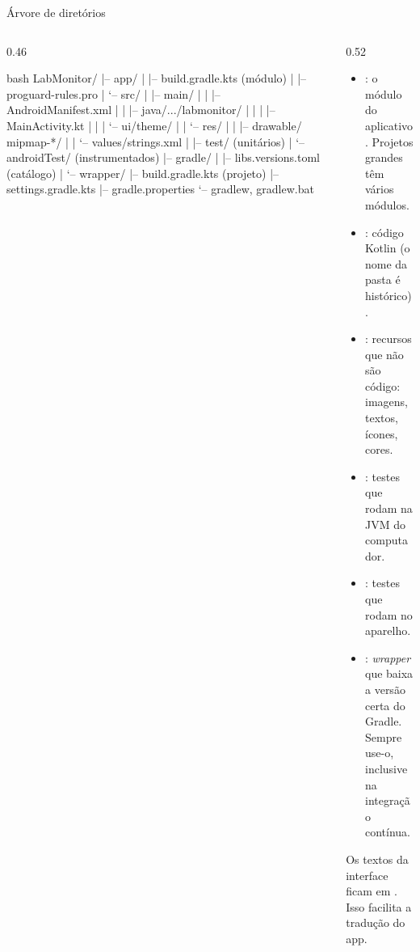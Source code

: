 \documentclass[aspectratio=169,10pt]{beamer}
\begin{document}
\begin{frame}[fragile]{Árvore de diretórios}
  \begin{columns}[T]
    \begin{column}{0.46\textwidth}
\begin{codigo}[title=LabMonitor/,listing options={style=dm,language=bash,basicstyle=\ttfamily\tiny}]{bash}
LabMonitor/
|-- app/
|   |-- build.gradle.kts      (módulo)
|   |-- proguard-rules.pro
|   `-- src/
|       |-- main/
|       |   |-- AndroidManifest.xml
|       |   |-- java/.../labmonitor/
|       |   |   |-- MainActivity.kt
|       |   |   `-- ui/theme/
|       |   `-- res/
|       |       |-- drawable/  mipmap-*/
|       |       `-- values/strings.xml
|       |-- test/            (unitários)
|       `-- androidTest/     (instrumentados)
|-- gradle/
|   |-- libs.versions.toml   (catálogo)
|   `-- wrapper/
|-- build.gradle.kts          (projeto)
|-- settings.gradle.kts
|-- gradle.properties
`-- gradlew, gradlew.bat
\end{codigo}
    \end{column}
    \begin{column}{0.52\textwidth}
      \small
      \begin{itemize}
        \item {}: o módulo do aplicativo. Projetos grandes têm vários módulos.
        \item {}: código Kotlin (o nome da pasta é histórico).
        \item {}: recursos que não são código: imagens, textos, ícones, cores.
        \item {}: testes que rodam na JVM do computador.
        \item {}: testes que rodam no aparelho.
        \item {}: \emph{wrapper} que baixa a versão certa do Gradle. Sempre use-o, inclusive na integração contínua.
      \end{itemize}
      \begin{dica}
        Os textos da interface ficam em . Isso facilita a tradução do app.
      \end{dica}
    \end{column}
  \end{columns}
\end{frame}
\end{document}
